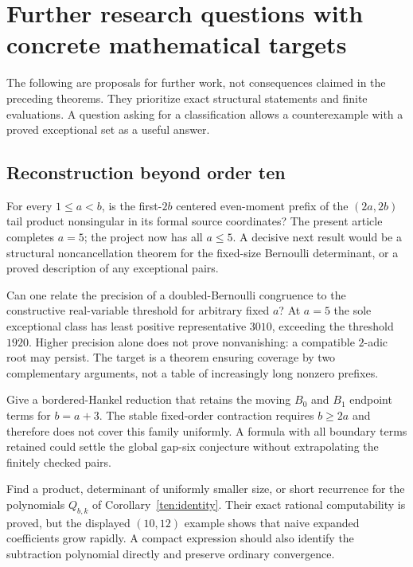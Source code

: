 \section{Further research questions with concrete mathematical targets}
\label{future:sec}

The following are proposals for further work, not consequences claimed
in the preceding theorems. They prioritize exact structural statements
and finite evaluations. A question asking for a classification allows
a counterexample with a proved exceptional set as a useful answer.

\subsection{Reconstruction beyond order ten}

\begin{question}
For every $1\le a<b$, is the first-$2b$ centered even-moment prefix
of the $(2a,2b)$ tail product nonsingular in its formal source
coordinates? The present article completes $a=5$; the project now
has all $a\le5$. A decisive next result would be a structural
noncancellation theorem for the fixed-size Bernoulli determinant,
or a proved description of any exceptional pairs.
\end{question}

\begin{question}
Can one relate the precision of a doubled-Bernoulli congruence to the
constructive real-variable threshold for arbitrary fixed $a$?
At $a=5$ the sole exceptional class has least positive representative
$3010$, exceeding the threshold $1920$. Higher precision alone does
not prove nonvanishing: a compatible $2$-adic root may persist. The
target is a theorem ensuring coverage by two complementary arguments,
not a table of increasingly long nonzero prefixes.
\end{question}

\begin{question}
Give a bordered-Hankel reduction that retains the moving $B_0$ and
$B_1$ endpoint terms for $b=a+3$. The stable fixed-order contraction
requires $b\ge2a$ and therefore does not cover this family uniformly.
A formula with all boundary terms retained could settle the global
gap-six conjecture without extrapolating the finitely checked pairs.
\end{question}

\begin{question}
Find a product, determinant of uniformly smaller size, or short
recurrence for the polynomials $Q_{b,k}$ of
Corollary~\ref{ten:identity}. Their exact rational computability is
proved, but the displayed $(10,12)$ example shows that naive expanded
coefficients grow rapidly. A compact expression should also identify
the subtraction polynomial directly and preserve ordinary convergence.
\end{question}


